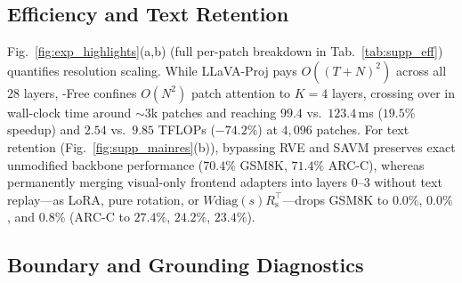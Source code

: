 \subsection{Efficiency and Text Retention}
\label{sec:eff}

Fig.~\ref{fig:exp_highlights}(a,b) (full per-patch breakdown in
Tab.~\ref{tab:supp_eff}) quantifies resolution scaling. While LLaVA-Proj pays
$O((T{+}N)^2)$ across all $28$ layers, \modelname-Free{} confines $O(N^2)$ patch
attention to $K{=}4$ layers, crossing over in wall-clock time around ${\sim}3$k
patches and reaching $99.4$ vs.\ $123.4$\,ms ($19.5\%$ speedup) and $2.54$ vs.\
$9.85$ TFLOPs ($-74.2\%$) at $4{,}096$ patches. For text retention
(Fig.~\ref{fig:supp_mainres}(b)), bypassing RVE and SAVM preserves exact
unmodified backbone performance ($70.4\%$ GSM8K, $71.4\%$ ARC-C), whereas
permanently merging visual-only frontend adapters into layers $0$--$3$ without
text replay---as LoRA, pure rotation, or $W\mathrm{diag}(s)R_{\mathrm{s}}^{\top}$---drops
GSM8K to $0.0\%$, $0.0\%$, and $0.8\%$ (ARC-C to $27.4\%$, $24.2\%$, $23.4\%$).

\subsection{Boundary and Grounding Diagnostics}
\label{sec:boundary}

